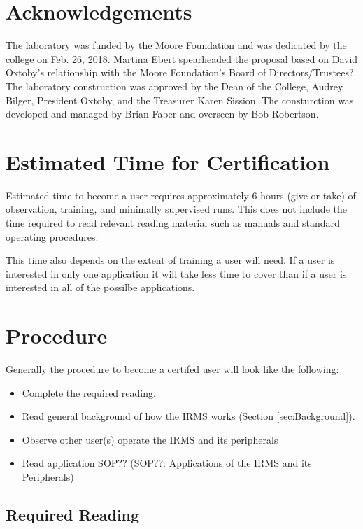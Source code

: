 \documentclass[12pt]{../SOP4_alpha}\usepackage[]{graphicx}\usepackage[]{color}
\begin{document}
\newpage
\section{Acknowledgements}

The laboratory was funded by the Moore Foundation and was dedicated by the college on Feb. 26, 2018. Martina Ebert spearheaded the proposal based on David Oxtoby's relationship with the Moore Foundation's Board of Directors/Trustees?. The laboratory construction was approved by the Dean of the College, Audrey Bilger, President Oxtoby, and the Treasurer Karen Sission. The consturction was developed and managed by Brian Faber and overseen by Bob Robertson.

\section{Estimated Time for Certification}

\NP Estimated time to become a user requires approximately 6 hours (give or take) of observation, training, and minimally supervised runs. This does not include the time required to read relevant reading material such as manuals and standard operating procedures.

\NP This time also depends on the extent of training a user will need. If a user is interested in only one application it will take less time to cover than if a user is interested in all of the possilbe applications.

\section{Procedure}

\NP Generally the procedure to become a certifed user will look like the following:

\begin{itemize}
  \item Complete the required reading.
  \item Read general background of how the IRMS works (\hyperref[sec:Background]{Section \ref*{sec:Background}}).
  \item Observe other user(s) operate the IRMS and its peripherals
  \item Read application SOP?? (SOP??: Applications of the IRMS and its Peripherals)
\end{itemize}

\subsection{Required Reading} \label{subsec:Required Reading}
\end{document}
